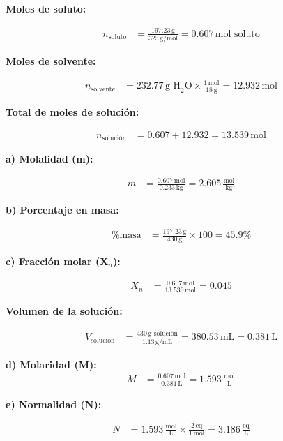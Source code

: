 \documentclass{article}
\begin{document}
\begin{multicols}{2}
\textbf{Moles de soluto:}

\begin{align*}
    n_{\text{soluto}} &= \frac{197.23 \, \text{g}}{325 \, \text{g/mol}} = 0.607 \, \text{mol soluto}
\end{align*}

\textbf{Moles de solvente:}

\begin{align*}
    n_{\text{solvente}} &= 232.77 \, \text{g H}_2\text{O} \times \frac{1 \, \text{mol}}{18 \, \text{g}} = 12.932 \, \text{mol}
\end{align*}

\textbf{Total de moles de solución:}

\begin{align*}
    n_{\text{solución}} &= 0.607 + 12.932 = 13.539 \, \text{mol}
\end{align*}

\textbf{a) Molalidad (m):}

\begin{align*}
    m &= \frac{0.607 \, \text{mol}}{0.233 \, \text{kg}} = 2.605 \, \frac{\text{mol}}{\text{kg}}
\end{align*}

\textbf{b) Porcentaje en masa:}

\begin{align*}
    \% \text{masa} &= \frac{197.23 \, \text{g}}{430 \, \text{g}} \times 100 = 45.9\%
\end{align*}

\textbf{c) Fracción molar (X$_n$):}

\begin{align*}
    X_n &= \frac{0.607 \, \text{mol}}{13.539 \, \text{mol}} = 0.045
\end{align*}

\textbf{Volumen de la solución:}

\begin{align*}
    V_{\text{solución}} &= \frac{430 \, \text{g solución}}{1.13 \, \text{g/mL}} = 380.53 \, \text{mL} = 0.381 \, \text{L}
\end{align*}

\textbf{d) Molaridad (M):}
\begin{align*}
    M &= \frac{0.607 \, \text{mol}}{0.381 \, \text{L}} = 1.593 \, \frac{\text{mol}}{\text{L}}
\end{align*}

\textbf{e) Normalidad (N):}

\begin{align*}
    N &= 1.593 \, \frac{\text{mol}}{\text{L}} \times \frac{2 \, \text{eq}}{1 \, \text{mol}} = 3.186 \, \frac{\text{eq}}{\text{L}}
\end{align*}


\end{multicols}
\end{document}
